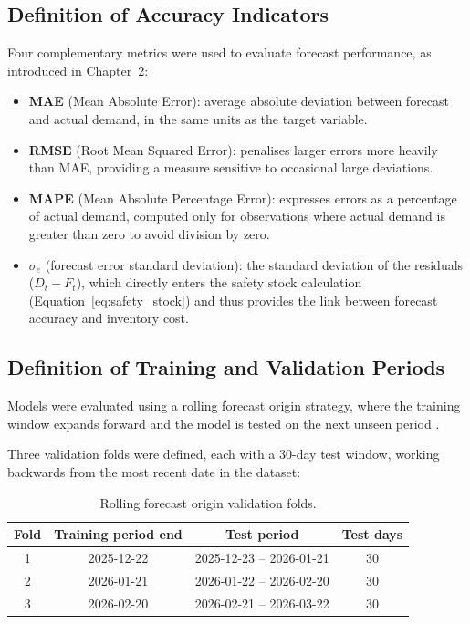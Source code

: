 \subsection{Definition of Accuracy Indicators}

Four complementary metrics were used to evaluate forecast performance, as introduced in Chapter~2:

\begin{itemize}
    \item \textbf{MAE} (Mean Absolute Error): average absolute deviation between forecast and actual demand, in the same units as the target variable.
    \item \textbf{RMSE} (Root Mean Squared Error): penalises larger errors more heavily than MAE, providing a measure sensitive to occasional large deviations.
    \item \textbf{MAPE} (Mean Absolute Percentage Error): expresses errors as a percentage of actual demand, computed only for observations where actual demand is greater than zero to avoid division by zero.
    \item \textbf{$\sigma_e$} (forecast error standard deviation): the standard deviation of the residuals ($D_t - F_t$), which directly enters the safety stock calculation (Equation~\ref{eq:safety_stock}) and thus provides the link between forecast accuracy and inventory cost.
\end{itemize}

\subsection{Definition of Training and Validation Periods}

Models were evaluated using a rolling forecast origin strategy, where the training window expands forward and the model is tested on the next unseen period \citep{hyndman2021forecasting}.

Three validation folds were defined, each with a 30-day test window, working backwards from the most recent date in the dataset:

\begin{table}[H]
\centering
\small
\caption{Rolling forecast origin validation folds.}
\label{tab:folds}
\begin{tabular}{|c|c|c|c|}
\hline
\textbf{Fold} & \textbf{Training period end} & \textbf{Test period} & \textbf{Test days} \\
\hline
1 & 2025-12-22 & 2025-12-23 -- 2026-01-21 & 30 \\
2 & 2026-01-21 & 2026-01-22 -- 2026-02-20 & 30 \\
3 & 2026-02-20 & 2026-02-21 -- 2026-03-22 & 30 \\
\hline
\end{tabular}
\end{table}

